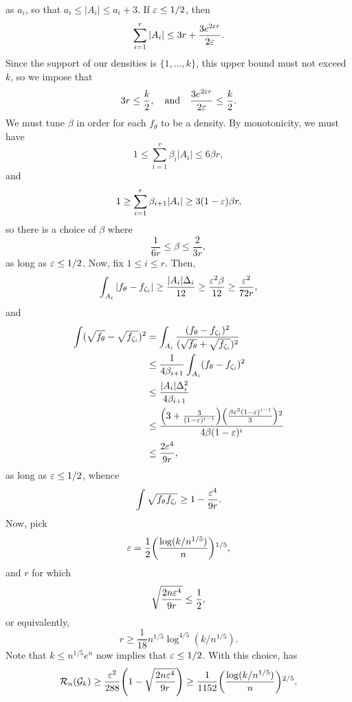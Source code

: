 as $a_i$, so that $a_i \le |A_i| \le a_i + 3$. If $\varepsilon \le 1/2$, then
\[
  \sum_{i = 1}^r |A_i| \le 3r + \frac{3 e^{2 \varepsilon r}}{2 \varepsilon} .
\]
Since the support of our densities is $\{1, \dots, k\}$, this upper
bound must not exceed $k$, so we impose that
\begin{equation}
  3r \le \frac{k}{2} , \quad \text{and} \quad \frac{ 3 e^{2 \eps r}}{2 \eps} \le \frac{k}{2} . \eqlabel{assouad-conv-conds}
\end{equation}
We must tune $\beta$ in order for each $f_\theta$ to be a density. By
monotonicity, we must have
\[
  1 \le \sum_{i = 1}^r \beta_i |A_i| \le 6 \beta r ,
\]
and
\[
  1 \ge \sum_{i = 1}^r \beta_{i + 1} |A_i| \ge 3(1 - \varepsilon) \beta r ,
\]
so there is a choice of $\beta$ where
\[
  \frac{1}{6 r} \le \beta \le \frac{2}{3 r} ,
\]
as long as $\varepsilon \le 1/2$. Now, fix $1 \le i \le r$. Then,
\[
  \int_{A_i} |f_\theta - f_{\zeta_i}| \ge \frac{|A_i| \Delta_i}{12} \ge \frac{\varepsilon^2 \beta}{12} \ge \frac{\varepsilon^2}{72 r} ,
\]
and
\begin{align*}
  \int (\sqrt{f_\theta} - \sqrt{f_{\zeta_i}})^2 &= \int_{A_i} \frac{(f_\theta - f_{\zeta_i})^2}{(\sqrt{f_{\theta}} + \sqrt{f_{\zeta_i}})^2} \\
                                                      &\le \frac{1}{4 \beta_{i + 1}} \int_{A_i} (f_\theta - f_{\zeta_i})^2 \\
                                                      &\le \frac{|A_i| \Delta_i^2}{4 \beta_{i + 1}} \\
                                                      &\le \frac{\left(3 + \frac{3}{(1 - \eps)^{i - 1}} \right) \left( \frac{\beta \eps^2 (1 - \eps)^{i - 1}}{3} \right)^2}{4 \beta (1 - \eps)^i} \\
                                                &\le \frac{2 \eps^4}{9 r} ,
\end{align*}
as long as $\varepsilon \le 1/2$, whence
\[
  \int \sqrt{f_\theta f_{\zeta_i}} \ge 1 - \frac{\varepsilon^4}{9 r} .
\]
Now, pick
\[
  \eps = \frac{1}{2} \left(\frac{\log (k/n^{1/5})}{n} \right)^{1/5} ,
\]
and $r$ for which
\[
  \sqrt{\frac{2 n \varepsilon^4}{9r}} \le \frac{1}{2} ,
\]
or equivalently,
\[
  r \ge \frac{1}{18} n^{1/5} \log^{4/5} (k/n^{1/5}) .
\]
Note that $k \le n^{1/5} e^n$ now implies that $\varepsilon \le 1/2$. With
this choice,  has
\begin{equation}
  \sR_n(\sG_k) \ge \frac{\eps^2}{288} \left(1 - \sqrt{\frac{2n \eps^4}{9r}} \right) \ge \frac{1}{1152} \left( \frac{\log (k/n^{1/5})}{n} \right)^{2/5} , \eqlabel{final-conv-lower}
\end{equation}

